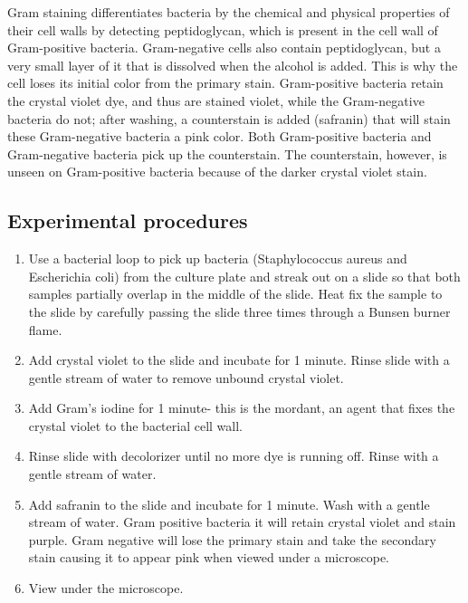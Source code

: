 \documentclass[]{book}
\providecommand{\tightlist}{%
  \setlength{\itemsep}{0pt}\setlength{\parskip}{0pt}}
\begin{document}
Gram staining differentiates bacteria by the chemical and physical properties of their cell walls by detecting peptidoglycan, which is present in the cell wall of Gram-positive bacteria. Gram-negative cells also contain peptidoglycan, but a very small layer of it that is dissolved when the alcohol is added. This is why the cell loses its initial color from the primary stain. Gram-positive bacteria retain the crystal violet dye, and thus are stained violet, while the Gram-negative bacteria do not; after washing, a counterstain is added (safranin) that will stain these Gram-negative bacteria a pink color. Both Gram-positive bacteria and Gram-negative bacteria pick up the counterstain. The counterstain, however, is unseen on Gram-positive bacteria because of the darker crystal violet stain.

\hypertarget{experimental-procedures-35}{%
\subsection{Experimental procedures}\label{experimental-procedures-35}}

\begin{enumerate}
\def\labelenumi{\arabic{enumi}.}
\tightlist
\item
  Use a bacterial loop to pick up bacteria (Staphylococcus aureus and Escherichia coli) from the culture plate and streak out on a slide so that both samples partially overlap in the middle of the slide. Heat fix the sample to the slide by carefully passing the slide three times through a Bunsen burner flame.
\item
  Add crystal violet to the slide and incubate for 1 minute. Rinse slide with a gentle stream of water to remove unbound crystal violet.
\item
  Add Gram's iodine for 1 minute- this is the mordant, an agent that fixes the crystal violet to the bacterial cell wall.
\item
  Rinse slide with decolorizer until no more dye is running off. Rinse with a gentle stream of water.
\item
  Add safranin to the slide and incubate for 1 minute. Wash with a gentle stream of water. Gram positive bacteria it will retain crystal violet and stain purple. Gram negative will lose the primary stain and take the secondary stain causing it to appear pink when viewed under a microscope.
\item
  View under the microscope.
\end{enumerate}
\end{document}

